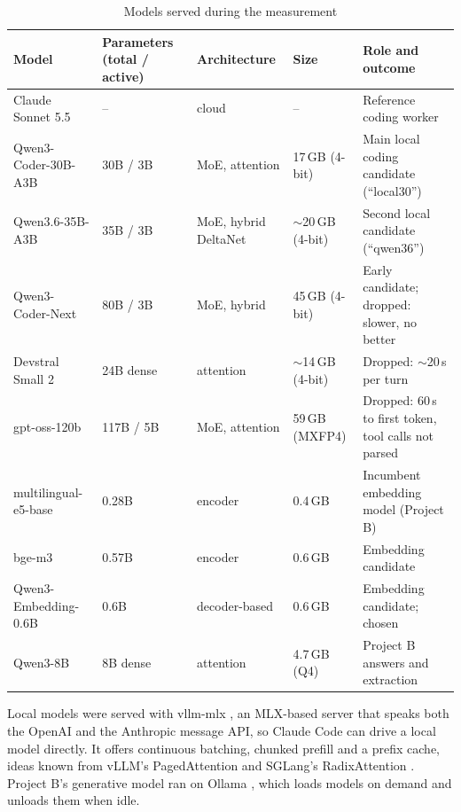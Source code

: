 \begin{table}[htbp]
\centering
\small
\caption{Models served during the measurement}\label{tab:models}
\begin{tabular}{P{3.4cm}P{1.9cm}P{2.2cm}P{2.2cm}P{3.9cm}}
\toprule
Model & Parameters (total / active) & Architecture & Size & Role and outcome \\
\midrule
Claude Sonnet 5.5 \citep{Anthropic-2026ab} & -- & cloud & -- & Reference coding worker \\
Qwen3-Coder-30B-A3B \citep{Qwen-Team-2025aa,Yang-2025aa} & 30B / 3B & MoE, attention & 17\,GB (4-bit) & Main local coding candidate (``local30'') \\
Qwen3.6-35B-A3B \citep{Qwen-Team-2026aa} & 35B / 3B & MoE, hybrid DeltaNet & ${\sim}$20\,GB (4-bit) & Second local candidate (``qwen36'') \\
Qwen3-Coder-Next \citep{Qwen-Team-2025ab} & 80B / 3B & MoE, hybrid & 45\,GB (4-bit) & Early candidate; dropped: slower, no better \\
Devstral Small 2 \citep{Mistral-AI-2025aa} & 24B dense & attention & ${\sim}$14\,GB (4-bit) & Dropped: ${\sim}$20\,s per turn \\
gpt-oss-120b \citep{OpenAI-2025aa} & 117B / 5B & MoE, attention & 59\,GB (MXFP4) & Dropped: 60\,s to first token, tool calls not parsed \\
\midrule
multilingual-e5-base \citep{Wang-2024aa} & 0.28B & encoder & 0.4\,GB & Incumbent embedding model (Project B) \\
bge-m3 \citep{Chen-2024aa} & 0.57B & encoder & 0.6\,GB & Embedding candidate \\
Qwen3-Embedding-0.6B \citep{Zhang-2025aa} & 0.6B & decoder-based & 0.6\,GB & Embedding candidate; chosen \\
Qwen3-8B \citep{Yang-2025aa} & 8B dense & attention & 4.7\,GB (Q4) & Project B answers and extraction \\
\bottomrule
\end{tabular}
\end{table}

Local models were served with vllm-mlx \citep{vllm-mlx-2026aa}, an MLX-based \citep{Hannun-2023aa} server that speaks
both the OpenAI and the Anthropic message API, so Claude Code can drive a local model directly. It offers continuous
batching, chunked prefill and a prefix cache, ideas known from vLLM's PagedAttention \citep{Kwon-2023aa} and SGLang's
RadixAttention \citep{Zheng-2024aa}. Project B's generative model ran on Ollama \citep{Ollama-2026aa}, which loads
models on demand and unloads them when idle.

